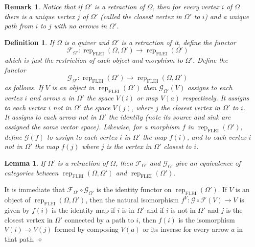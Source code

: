 \documentclass{article}
\newcommand{\maps}{:}
\newcommand{\FF}{\mathscr{F}}
\newcommand{\GG}{\mathscr{G}}
\newtheorem{lemma}{Lemma}[section]
\newtheorem{definition}{Definition}
\newtheorem{remark}{Remark}[section]
\newenvironment{proof}{\vspace*{2ex}\noindent {\em Proof:}
}{\hfill $\diamond$ \\[2ex]}
\begin{document}
\begin{remark}
  Notice that if $\Omega'$ is a retraction of $\Omega$, then for every vertex $i$ of $\Omega$ there is a unique vertex $j$ of $\Omega'$ (called the \emph{closest} vertex in $\Omega'$ to $i$) and a unique path from $i$ to $j$ with no arrows in $\Omega'$.  
\end{remark}

\begin{definition}
  If $\Omega$ is a quiver and $\Omega'$ is a retraction of it, define the functor
  \[\FF_{\Omega'}\maps \operatorname{rep}_{\text{FLEI}}(\Omega,\Omega') \to  \operatorname{rep}_{\text{FLEI}}(\Omega')\]
  which is just the restriction of each object and morphism to $\Omega'$.  Define the functor
  \[\GG_{\Omega'} \maps \operatorname{rep}_{\text{FLEI}}(\Omega') \to \operatorname{rep}_{\text{FLEI}}(\Omega,\Omega')\]
  as follows.  If $V$ is an object in   $\operatorname{rep}_{\text{FLEI}}(\Omega')$ then  $\GG_{\Omega'}(V)$ assigns to each vertex $i$  and arrow $a$ in $\Omega'$ the  space $V(i)$ or map $V(a)$ respectively. It assigns to each vertex $i$ \emph{not} in $\Omega'$ the space $V(j)$, where $j$ the closest vertex in $\Omega'$ to $i$.  It assigns to each arrow not in $\Omega'$ the identity (note its source and sink are assigned the same vector space).  Likewise, for a morphism $f$ in $\operatorname{rep}_{\text{FLEI}}(\Omega')$, define $\GG(f)$ to assign to each vertex $i$ in $\Omega'$ the map $f(i)$, and to each vertex $i$ not in $\Omega'$ the map $f(j)$ where $j$ is the vertex in $\Omega'$ closest to $i$.
\end{definition}

\begin{lemma} \label{lem:equivalence of categories}
 If  $\Omega'$ is a retraction of $\Omega$,  then $\FF_{\Omega'}$ and $\GG_{\Omega'}$ give an equivalence of categories between $\operatorname{rep}_{\text{FLEI}}(\Omega,\Omega')$ and $\operatorname{rep}_{\text{FLEI}}(\Omega')$.  
\end{lemma}

\begin{proof}
It is immediate that $\FF_{\Omega'}\circ \GG_{\Omega'}$ is the identity functor on $\operatorname{rep}_{\text{FLEI}}(\Omega')$. If $V$ is an object of $\operatorname{rep}_{\text{FLEI}}(\Omega,\Omega')$, then the natural isomorphism $f^V \maps \GG \circ \FF(V) \to V$ is given by $f(i)$ is the identity map if $i$ is in $\Omega'$ and if $i$ is not in $\Omega'$ and $j$ is the closest vertex in $\Omega'$ connected by a path to $i$, then $f(i)$ is the isomorphism $V(i)\to V(j)$ formed by composing $V(a)$ or its inverse for every arrow $a$ in that path. 
\end{proof}
\end{document}
